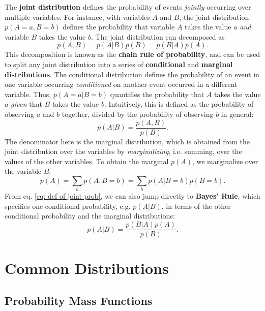 The \textbf{joint distribution} defines the probability of events \textit{jointly} occurring over multiple variables. For instance, with variables $A$ and $B$, the joint distribution $p(A=a,B=b)$ defines the probability that variable $A$ takes the value $a$ \textit{and} variable $B$ takes the value $b$. The joint distribution can decomposed as
\begin{equation}
    p(A,B) = p(A|B)p(B) = p(B|A)p(A).
    \label{eq: def of joint prob}
\end{equation}
This decomposition is known as the \textbf{chain rule of probability}, and can be used to split any joint distribution into a series of \textbf{conditional} and \textbf{marginal distributions}. The conditional distribution defines the probability of an event in one variable occurring \textit{conditioned} on another event occurred in a different variable. Thus, $p(A=a | B=b)$ quantifies the probability that $A$ takes the value $a$ \textit{given} that $B$ takes the value $b$. Intuitively, this is defined as the probability of observing $a$ and $b$ together, divided by the probability of observing $b$ in general:
\begin{equation}
    p(A|B) = \frac{p(A,B)}{p(B)}.
    \label{eq: def of cond prob}
\end{equation}
The denominator here is the marginal distribution, which is obtained from the joint distribution over the variables by \textit{marginalizing}, i.e. summing, over the values of the other variables. To obtain the marginal $p(A)$, we marginalize over the variable $B$:
\begin{equation}
    p(A) = \sum_b p(A, B=b) = \sum_b p(A | B=b) p(B=b).
    \label{eq: def of marginal prob}
\end{equation}
From eq. \ref{eq: def of joint prob}, we can also jump directly to \textbf{Bayes' Rule}, which specifies one conditional probability, e.g. $p(A|B)$, in terms of the other conditional probability and the marginal distributions:
\begin{equation}
    p(A|B) = \frac{p(B|A)p(A)}{p(B)}.
    \label{eq: bayes rule}
\end{equation}

\section{Common Distributions}

\subsection{Probability Mass Functions}


